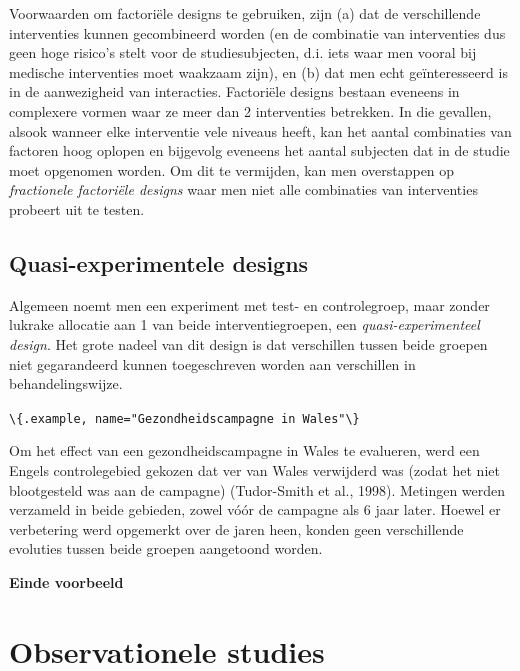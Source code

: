 \documentclass[
  12pt,dutch,coursenotes]{book}
\newcommand{\passthrough}[1]{#1}
\begin{document}
Voorwaarden om factoriële designs te gebruiken, zijn (a) dat de
verschillende interventies kunnen gecombineerd worden (en de combinatie van
interventies dus geen hoge risico's stelt voor de studiesubjecten, d.i. iets waar men vooral bij medische interventies moet waakzaam zijn), en (b) dat men
echt geïnteresseerd is in de aanwezigheid van interacties. Factoriële designs bestaan eveneens in complexere vormen waar ze meer dan 2 interventies betrekken. In die gevallen, alsook wanneer elke interventie vele niveaus heeft, kan het aantal combinaties van factoren hoog oplopen en bijgevolg eveneens het aantal subjecten dat in de studie moet opgenomen worden. Om dit te vermijden, kan men overstappen op \emph{fractionele factoriële designs} waar men niet alle combinaties van interventies probeert uit te testen.

\hypertarget{quasi-experimentele-designs}{%
\subsection{Quasi-experimentele designs}\label{quasi-experimentele-designs}}

Algemeen noemt men een experiment met test- en controlegroep, maar zonder
lukrake allocatie aan 1 van beide interventiegroepen, een \emph{quasi-experimenteel design}. Het grote nadeel van dit design is dat
verschillen tussen beide groepen niet gegarandeerd kunnen toegeschreven
worden aan verschillen in behandelingswijze.

\passthrough{\lstinline!\{.example, name="Gezondheidscampagne in Wales"\}!}

Om het effect van een gezondheidscampagne in Wales te evalueren, werd
een Engels controlegebied gekozen dat ver van Wales verwijderd was (zodat
het niet blootgesteld was aan de campagne) (Tudor-Smith et al., 1998).
Metingen werden verzameld in beide gebieden, zowel vóór de campagne
als 6 jaar later. Hoewel er verbetering werd opgemerkt over de jaren heen,
konden geen verschillende evoluties tussen beide groepen aangetoond worden.

\textbf{Einde voorbeeld}

\hypertarget{sec:observational}{%
\section{Observationele studies}\label{sec:observational}}
\end{document}
